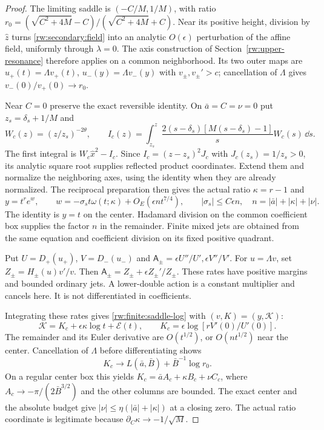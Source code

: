 \begin{proof}
The limiting saddle is $(-C/M,1/M)$, with ratio
$r_0=(\sqrt{C^2+4M}-C)/(\sqrt{C^2+4M}+C)$.
Near its positive height, division by $\hat z$ turns
\eqref{rw:secondary:field} into an analytic $O(\epsilon)$
perturbation of the affine field, uniformly through $\lambda=0$.
The axis construction of Section~\ref{rw:upper-resonance} therefore
applies on a common neighborhood. Its two outer maps are
$u_+(t)=\Lambda v_+(t)$, $u_-(y)=\Lambda v_-(y)$ with
$v_\pm,v_\pm'>c$; cancellation of $\Lambda$ gives
$v_-(0)/v_+(0)\to r_0$.

Near $C=0$ preserve the exact reversible identity.
On $\bar a=C=\nu=0$ put $z_s=\delta_s+1/M$ and
\[
 W_c(z)=(z/z_s)^{-2\theta},\qquad
 I_c(z)=\int_{z_s}^z
       \frac{2(s-\delta_s)[M(s-\delta_s)-1]}sW_c(s)\,\dd s .
\]
The first integral is $W_c\hat x^2-I_c$.
Since $I_c=(z-z_s)^2J_c$ with $J_c(z_s)=1/z_s>0$,
its analytic square root supplies reflected product coordinates.
Extend them and normalize the neighboring axes, using the identity
when they are already normalized. The reciprocal preparation then
gives the actual ratio $\kappa=r-1$ and
\[
 y=t^re^w,\qquad
 w=-\sigma_s t\omega(t;\kappa)+O_E(\epsilon n t^{7/4}),
 \qquad |\sigma_s|\le C\epsilon n,\quad
 n=|\bar a|+|\kappa|+|\nu|.
\]
The identity is $y=t$ on the center. Hadamard division on the
common coefficient box supplies the factor $n$ in the remainder.
Finite mixed jets are obtained from the same equation and
coefficient division on its fixed positive quadrant.

Put $U=D_+(u_+)$, $V=D_-(u_-)$ and
$\mathsf A_\pm=\epsilon U''/U',\epsilon V''/V'$.
For $u=\Lambda v$, set
$Z_\pm=H_\pm(u)v'/v$.
Then $\mathsf A_\pm=Z_\pm+\epsilon Z_\pm'/Z_\pm$.
These rates have positive margins and bounded ordinary jets.
A lower-double action is a constant multiplier and cancels here.
It is not differentiated in coefficients.

Integrating these rates gives \eqref{rw:finite:saddle-log} with
$(v,K)=(y,\mathcal K)$:
\begin{equation}\label{rw:secondary:saddle-log}
 \mathcal K=K_c+\epsilon\kappa\log t+\mathcal E(t),\qquad
 K_c=\epsilon\log[rV'(0)/U'(0)] .
\end{equation}
The remainder and its Euler derivative are $O(t^{1/2})$,
or $O(nt^{1/2})$ near the center. Cancellation of $\Lambda$
before differentiating shows
\[
 K_c\longrightarrow L(\bar a,\bar B)+\bar B^{-1}\log r_0 .
\]
On a regular center box this yields
$K_c=\bar a A_c+\kappa B_c+\nu C_c$, where
$A_c\to-\pi/(2\bar B^{3/2})$ and the other columns are bounded.
The exact center and the absolute budget give
$|\nu|\le\eta(|\bar a|+|\kappa|)$ at a closing zero.
The actual ratio coordinate is legitimate because
$\partial_C\kappa\to-1/\sqrt M$.


\end{proof}
